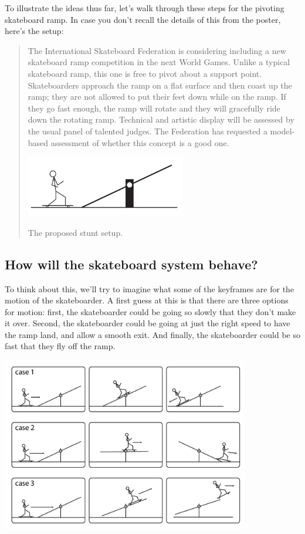 To illustrate the ideas thus far, let's walk through these steps for the pivoting skateboard ramp.  In case you don't recall the details of this from the poster, here's the setup:

\begin{quote}
The International Skateboard Federation is considering including
 a new skateboard ramp competition in the next World
Games. Unlike a typical skateboard ramp, this one is free to pivot
about a support point.  Skateboarders approach the ramp on a flat
surface and then coast up the ramp; they are not allowed to put their
feet down while on the ramp.  If they go fast enough, the ramp will
rotate and they will gracefully ride down the rotating ramp.
Technical and artistic display will be assessed by the usual panel of
talented judges.
The Federation has requested a model-based assessment of whether this concept is a good one.

\begin{marginfigure}
\includegraphics[width=7cm]{figs/skateboard1}
\caption{The proposed stunt setup.}
\end{marginfigure}

\end{quote}

\subsection{How will the skateboard system behave?}

To think about this, we'll try to imagine what some of the keyframes are for the motion of the skateboarder.  A first guess at this is that there are three options for motion:  first, the skateboarder could be going so slowly that they don't make it over.  Second, the skateboarder could be going at just the right speed to have the ramp land, and allow a smooth exit.  And finally, the skateboarder could be so fast that they fly off the ramp.

\includegraphics[height=3in]{figs/improvedskateboardkeyframes}

